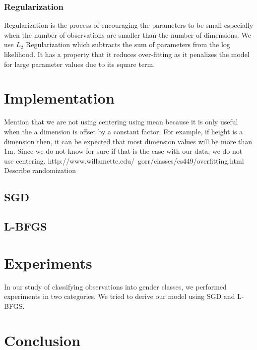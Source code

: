 \documentclass{acm_proc_article-sp}
\begin{document}
\subsubsection*{Regularization}
Regularization is the process of encouraging the parameters to be small especially when the number of observations are smaller than the number of dimensions\cite{ng2004feature}. We use $L_2$ Regularization which subtracts the sum of parameters from the log likelihood. It has a property that it reduces over-fitting as it penalizes the model for large parameter values due to its square term.
\section{Implementation}
Mention that we are not using centering using mean because it is only useful when the a dimension is offset by a constant factor\cite{bro2003centering}. For example, if height is a dimension then, it can be expected that most dimension values will be more than 1m. Since we do not know for sure if that is the case with our data, we do not use centering.
http://www.willamette.edu/~gorr/classes/cs449/overfitting.html
Describe randomization
\subsection{SGD}
\subsection{L-BFGS}
\section{Experiments}
In our study of classifying observations into gender classes, we performed experiments in two categories. We tried to derive our model using SGD and L-BFGS.



\section{Conclusion}
\end{document}
